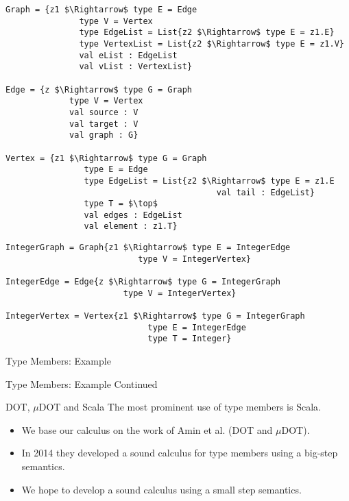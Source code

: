 \documentclass[dvipsnames]{beamer}
\begin{document}
\begin{lrbox}{\tmExA}
\begin{lstlisting}[mathescape, style=customlang]
Graph = {z1 $\Rightarrow$ type E = Edge
               type V = Vertex
               type EdgeList = List{z2 $\Rightarrow$ type E = z1.E}
               type VertexList = List{z2 $\Rightarrow$ type E = z1.V}
               val eList : EdgeList
               val vList : VertexList}

Edge = {z $\Rightarrow$ type G = Graph
             type V = Vertex
             val source : V
             val target : V
             val graph : G}
             
Vertex = {z1 $\Rightarrow$ type G = Graph
                type E = Edge
                type EdgeList = List{z2 $\Rightarrow$ type E = z1.E
                                           val tail : EdgeList}
                type T = $\top$
                val edges : EdgeList
                val element : z1.T}
\end{lstlisting}
\end{lrbox}

\begin{lrbox}{\tmExAcont}
\begin{lstlisting}[mathescape, style=customlang]		      
IntegerGraph = Graph{z1 $\Rightarrow$ type E = IntegerEdge
                           type V = IntegerVertex}
		
IntegerEdge = Edge{z $\Rightarrow$ type G = IntegerGraph
                        type V = IntegerVertex}
		
IntegerVertex = Vertex{z1 $\Rightarrow$ type G = IntegerGraph
                             type E = IntegerEdge
                             type T = Integer}
\end{lstlisting}
\end{lrbox}

\begin{frame}{Type Members: Example}
\begin{example}
\usebox{\tmExA}
\end{example}
\end{frame}

\begin{frame}{Type Members: Example Continued}
\begin{example}
\usebox{\tmExAcont}
\end{example}
\end{frame}


\begin{frame}{DOT, $\mu$DOT and Scala}
The most prominent use of type members is Scala. 
\begin{itemize}
\item
We base our calculus on the work of Amin et al. (DOT and $\mu$DOT).
\item
In 2014 they developed a sound calculus for type members using a big-step semantics.
\item
We hope to develop a sound calculus using a small step semantics.
\end{itemize}
\end{frame}
\end{document}
